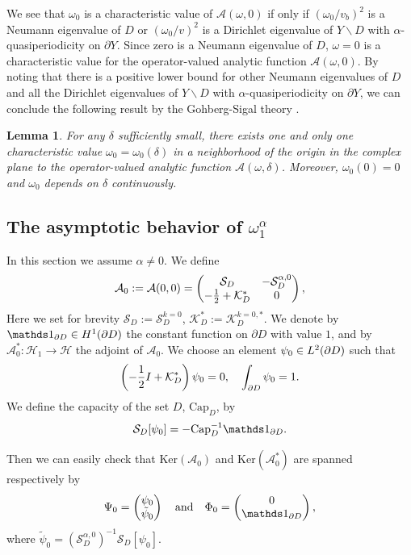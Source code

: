 \documentclass[11pt]{article}
\numberwithin{equation}{section}
\newtheorem{lem}{Lemma}[section]
\def\cH{{\mathcal{H}}}
\def\cS{{\mathcal{S}}}
\def\cK{{\mathcal{K}}}
\def\Ker{{\mathrm{Ker}}}
\def\capacity{{\mathrm{Cap}}}
\newcommand\1{{\ensuremath {\mathds 1} }}
\begin{document}
We see that $\omega_0$ is a characteristic value of $\mathcal{A}(\omega,0)$ if only if $(\omega_0 / v_b)^2$ is a Neumann eigenvalue of $D$ or $(\omega_0/v)^2$ is a Dirichlet eigenvalue of $Y\backslash D$ with $\alpha$-quasiperiodicity on $\partial Y$.  Since 
zero is a Neumann eigenvalue of $D$, 
$\omega=0$ is a characteristic value for the operator-valued analytic function $\mathcal{A}(\omega,0)$. {By noting that there is a positive lower bound for other Neumann eigenvalues of $D$ and all the Dirichlet eigenvalues of $Y\backslash D$ with $\alpha$-quasiperiodicity on $\partial Y$,}  we can conclude the following result by the Gohberg-Sigal theory \cite{Ammari2009_book, Gohberg1971}.
\begin{lem}
For any $\delta$ sufficiently small, there exists {one and only one} characteristic value 
$\omega_0= \omega_0(\delta)$ in a neighborhood of the origin in the complex plane to the operator-valued analytic function 
$\mathcal{A}(\omega, \delta)$.
Moreover,  
$\omega_0(0)=0$ and $\omega_0$ depends on $\delta$ continuously.
\end{lem}



\medskip

\subsection{The asymptotic behavior of $\omega_1^\alpha$}
In this section we assume $\alpha \ne 0$. 
We define
\begin{equation} \label{defA0}
\mathcal{A}_0 :=\mathcal{A}(0,0)= 
 \begin{pmatrix}
  \mathcal{S}_D&  -\mathcal{S}_D^{\alpha,0}  \\
  -\frac{1}{2}+ \mathcal{K}_D^{*}& 0
\end{pmatrix},
\end{equation} 
Here we set for brevity $\cS_D := \cS_D^{k = 0}$, $\cK_D^* := \cK_D^{k=0,*}$. We denote by $\1_{\p D} \in H^1(\p D)$ the constant function on $\partial D$ with value $1$, and by $\mathcal{A}_0^* : \cH_1 \to \cH$ the adjoint of $\mathcal{A}_0$. We choose an element $\psi_0\in L^2(\partial D)$ such that
$$ \left( -\frac12 I +\cK_D^*  \right) \psi_0=0,\quad  \int_{\p D} \psi_0 = 1.$$
We define  the capacity of the set $D$,  $\capacity_D$, by
\begin{equation}\label{capacity} 
\cS_D [\psi_0] = -\capacity_D^{-1} \1_{\p D}.
\end{equation}

Then we can easily check that $\Ker (\mathcal{A}_0)$ and $ \Ker (\mathcal{A}_0^*)$ are spanned respectively by
\[
\Psi_0 = \begin{pmatrix}
    \psi_0\\
  \tilde\psi_0\end{pmatrix}
  \quad \text{and} \quad
  \Phi_0 = \begin{pmatrix}
    0\\
  \1_{\p D} \end{pmatrix},
\]
where  $\tilde \psi_0 =( \mathcal{S}_D^{\alpha,0})^{-1} \mathcal{S}_D[\psi_0]$.
\end{document}
